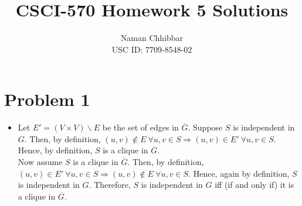 \documentclass{article}
\title{CSCI-570 Homework 5 Solutions}
\author{
  Naman Chhibbar \\
  USC ID: 7709-8548-02
}
\date{}
\begin{document}
\maketitle

\section{Problem 1}
  \begin{itemize}
    \item[(a)] Let $E' = (V \times V) \backslash E$ be the set of edges in $\overline{G}$.
    Suppose $S$ is independent in $G$.
    Then, by definition, $(u, v) \notin E ~ \forall u, v \in S \Rightarrow (u, v) \in E' ~ \forall u, v \in S$.
    Hence, by definition, $S$ is a clique in $\overline{G}$. \\
    Now assume $S$ is a clique in $\overline{G}$.
    Then, by definition, $(u, v) \in E' ~ \forall u, v \in S \Rightarrow (u, v) \notin E ~ \forall u, v \in S$.
    Hence, again by definition, $S$ is independent in $G$.
    Therefore, $S$ is independent in $G$ iff (if and only if) it is a clique in $\overline{G}$.


\end{itemize}
\end{document}
